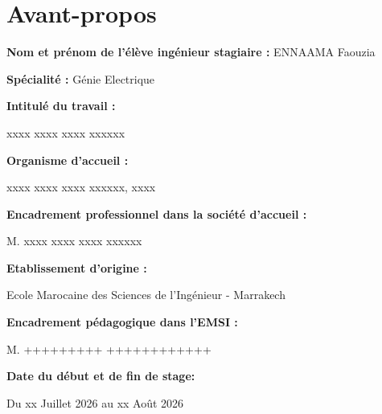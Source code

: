 \chapter*{Avant-propos}
{}
\adjustmtc
\thispagestyle{MyStyle}
%
\textbf{Nom et prénom de l’élève ingénieur stagiaire :} ENNAAMA Faouzia 

\textbf{Spécialité :} Génie Electrique

\textbf{Intitulé du travail :}
\begin{center}
	xxxx xxxx xxxx xxxxxx
\end{center}
\textbf{Organisme d’accueil :}
\begin{center}
	xxxx xxxx xxxx xxxxxx, xxxx
\end{center}
\textbf{Encadrement professionnel dans la société d’accueil :}
\begin{center}
M.	xxxx xxxx xxxx xxxxxx
	
	
\end{center}
\textbf{Etablissement d’origine :}
\begin{center}
	Ecole Marocaine des Sciences de l'Ingénieur - Marrakech
\end{center}
\textbf{Encadrement pédagogique dans l’EMSI :}
\begin{center}
	M. +++++++++ ++++++++++++
	
	
\end{center}
\textbf{Date du début et de fin de stage:}
\begin{center}
	Du xx Juillet 2026 au xx Août 2026
\end{center}

